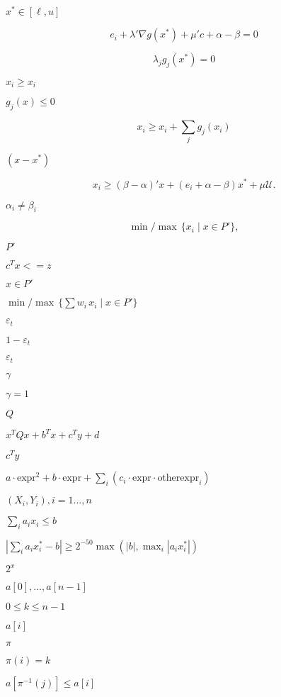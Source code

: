 \documentclass{article}
\begin{document}
$ x^* \in [\ell,u] $
\pagebreak

\[
     e_i + \lambda' \nabla g(x^*) + \mu' c + \alpha - \beta = 0
\]
\pagebreak

\[
     \lambda_j g_j(x^*) = 0
\]
\pagebreak

$ x_i \ge x_i $
\pagebreak

$ g_j(x) \le 0 $
\pagebreak

\[
     x_i \ge x_i + \sum_{j} g_j(x_i)
\]
\pagebreak

$ (x - x^*) $
\pagebreak

\[
     x_i \ge (\beta - \alpha)'x + (e_i + \alpha - \beta) x^* + \mu \mathcal{U}.
\]
\pagebreak

$ \alpha_i \neq \beta_i $
\pagebreak

\[
     \min / \max \, \{ x_i \mid x \in P' \},
\]
\pagebreak

$P'$
\pagebreak

$c^T x <= z$
\pagebreak

$x \in P'$
\pagebreak

$\min / \max \, \{ \sum w_i \, x_i \mid x \in P' \}$
\pagebreak

$ \varepsilon_t$
\pagebreak

$ 1 - \varepsilon_t $
\pagebreak

$ \varepsilon_t $
\pagebreak

$ \gamma $
\pagebreak

$ \gamma = 1$
\pagebreak

$Q$
\pagebreak

$x^T Q x + b^T x + c^T y + d$
\pagebreak

$c^T y$
\pagebreak

$a \cdot \text{expr}^2 + b \cdot \text{expr} + \sum_i (c_i \cdot \text{expr} \cdot \text{otherexpr}_i)$
\pagebreak

$(X_i,Y_i), i=1\dots,n$
\pagebreak

$ \sum_i a_ix_i \leq b $
\pagebreak

$ |\sum_i a_ix^*_i - b| \geq 2^{-50} \max (|b|, \max_i |a_ix^*_i|) $
\pagebreak

$2^x$
\pagebreak

$ a[0], ..., a[n-1] $
\pagebreak

$ 0 \leq k \leq n - 1 $
\pagebreak

$ a[i] $
\pagebreak

$ \pi $
\pagebreak

$ \pi(i) = k  $
\pagebreak

$ a[\pi^{-1}(j)] \leq a[i]  $
\pagebreak
\end{document}
